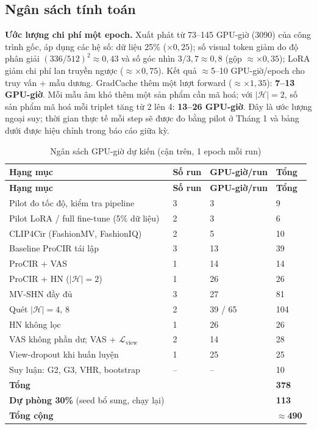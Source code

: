 \documentclass[a4paper]{article}
\begin{document}
\subsection{Ngân sách tính toán}\label{sec:budget}

\textbf{Ước lượng chi phí một epoch.} Xuất phát từ 73--145 GPU-giờ (3090) của công trình gốc, áp dụng các hệ số: dữ liệu 25\% ($\times0{,}25$); số visual token giảm do độ phân giải $(336/512)^2\approx0{,}43$ và số góc nhìn $3/3{,}7\approx0{,}8$ (gộp $\approx\times0{,}35$); LoRA giảm chi phí lan truyền ngược ($\approx\times0{,}75$). Kết quả $\approx$5--10 GPU-giờ/epoch cho truy vấn + mẫu dương. GradCache thêm một lượt forward ($\approx\times1{,}35$): \textbf{7--13 GPU-giờ}. Mỗi mẫu âm khó thêm một sản phẩm cần mã hoá; với $|\mathcal{H}|=2$, số sản phẩm mã hoá mỗi triplet tăng từ 2 lên 4: \textbf{13--26 GPU-giờ}. Đây là ước lượng ngoại suy; thời gian thực tế mỗi step sẽ được đo bằng pilot ở Tháng 1 và bảng dưới được hiệu chỉnh trong báo cáo giữa kỳ.

\begin{longtable}{L{6.4cm}C{1.2cm}C{2.6cm}C{2.4cm}}
\caption{Ngân sách GPU-giờ dự kiến (cận trên, 1 epoch mỗi run)}\label{tab:budget}\\
\toprule
\textbf{Hạng mục} & \textbf{Số run} & \textbf{GPU-giờ/run} & \textbf{Tổng}\\
\midrule\endfirsthead
\toprule
\textbf{Hạng mục} & \textbf{Số run} & \textbf{GPU-giờ/run} & \textbf{Tổng}\\
\midrule\endhead
Pilot đo tốc độ, kiểm tra pipeline & 3 & 3 & 9\\
Pilot LoRA / full fine-tune (5\% dữ liệu) & 2 & 3 & 6\\
CLIP4Cir (FashionMV, FashionIQ) & 2 & 5 & 10\\
Baseline ProCIR tái lập & 3 & 13 & 39\\
ProCIR + VAS & 1 & 14 & 14\\
ProCIR + HN ($|\mathcal{H}|=2$) & 1 & 26 & 26\\
MV-SHN đầy đủ & 3 & 27 & 81\\
Quét $|\mathcal{H}| = 4,\,8$ & 2 & 39 / 65 & 104\\
HN không lọc & 1 & 26 & 26\\
VAS không phần dư; VAS + $\mathcal{L}_{\text{view}}$ & 2 & 14 & 28\\
View-dropout khi huấn luyện & 1 & 25 & 25\\
Suy luận: G2, G3, VHR, bootstrap & -- & -- & 10\\
\midrule
\textbf{Tổng} & & & \textbf{378}\\
\textbf{Dự phòng 30\%} (seed bổ sung, chạy lại) & & & \textbf{113}\\
\textbf{Tổng cộng} & & & \textbf{$\approx$490}\\
\bottomrule
\end{longtable}
\end{document}

